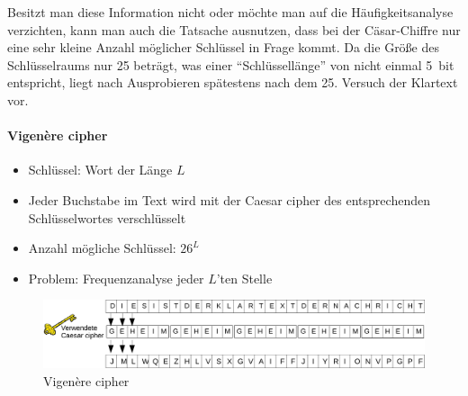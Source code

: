 \documentclass[10pt,a4paper]{article}
\begin{document}
\noindent
Besitzt man diese Information nicht oder möchte man auf die Häufigkeitsanalyse verzichten, kann man auch die Tatsache ausnutzen, dass bei der Cäsar-Chiffre nur eine sehr kleine Anzahl möglicher Schlüssel in Frage kommt. Da die Größe des Schlüsselraums nur 25 beträgt, was einer "`Schlüssellänge"' von nicht einmal 5~bit entspricht, liegt nach Ausprobieren spätestens nach dem 25. Versuch der Klartext vor.

\paragraph*{Vigenère cipher}
\begin{itemize}[noitemsep,topsep=0pt,leftmargin=*]
    \item Schlüssel: Wort der Länge $L$
    \item Jeder Buchstabe im Text wird mit der Caesar cipher des entsprechenden Schlüsselwortes verschlüsselt
    \item Anzahl mögliche Schlüssel: $26^L$
    \item Problem: Frequenzanalyse jeder $L$'ten Stelle
\end{itemize}
\begin{figure}[H]
    \begin{center}
    \includegraphics[width=16cm]{images/vigenere.png}
    \caption{Vigenère cipher}
    \label{vigenere}
    \end{center}
\end{figure}
\end{document}
